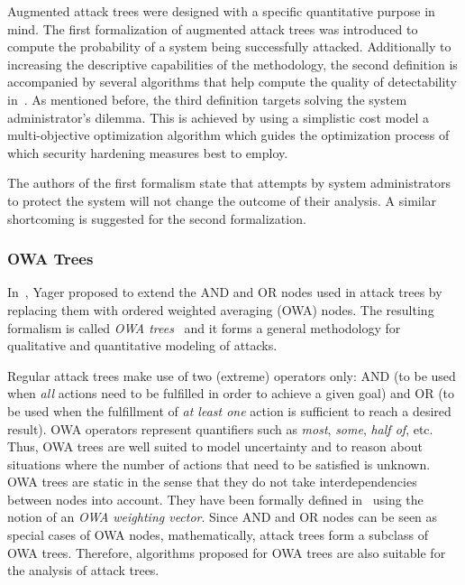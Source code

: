 \documentclass[a4paper]{article}
\begin{document}
Augmented attack trees were designed with a specific quantitative purpose in
mind. The first formalization of augmented attack trees was introduced to
compute the probability of a system being successfully attacked. Additionally
to increasing the descriptive capabilities of the methodology, the second
definition is accompanied by several algorithms that help compute the quality
of detectability in~\cite{WaPhWhPa2}. As mentioned before, the third
definition targets solving the system administrator's dilemma. This is
achieved by using a simplistic cost model a multi-objective optimization
algorithm which guides the optimization process of which security hardening
measures best to employ.

The authors of the first formalism state that attempts by system
administrators to protect the system will not change the outcome of their
analysis. A similar shortcoming is suggested for the second formalization.

\subsubsection{OWA Trees} 
\label{sec:OWA_trees}

In~, Yager proposed to extend the AND and OR nodes used in attack trees by
replacing them with ordered weighted averaging (OWA) nodes. The resulting
formalism is called \emph{OWA trees}~\cite{Yage} and it forms a general
methodology for qualitative and quantitative modeling of attacks.

Regular attack trees make use of two (extreme) operators only: AND (to be used
when \emph{all} actions need to be fulfilled in order to achieve a given goal)
and OR (to be used when the fulfillment of \emph{at least one} action is
sufficient to reach a desired result). OWA operators represent quantifiers such
as \emph{most}, \emph{some}, \emph{half of}, etc. Thus, OWA trees are well
suited to model uncertainty and to reason about situations where the number of
actions that need to be satisfied is unknown. OWA trees are static in the sense
that they do not take interdependencies between nodes into account. They have
been formally defined in~\cite{Yage} using the notion of an \emph{OWA weighting
vector}. Since AND and OR nodes can be seen as special cases of OWA nodes,
mathematically, attack trees form a subclass of OWA trees. Therefore, algorithms
proposed for OWA trees are also suitable for the analysis of attack trees.
\end{document}

